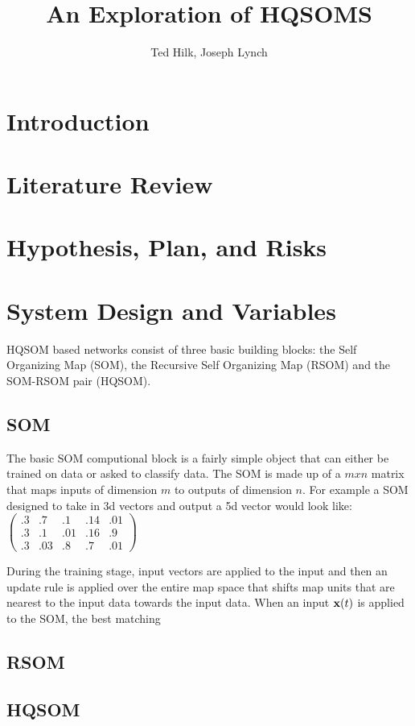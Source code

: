 \documentclass[a4paper,10pt]{article}
\title{An Exploration of HQSOMS}
\author{Ted Hilk, Joseph Lynch}
\begin{document}
\maketitle

\begin{abstract}

\end{abstract}

\section{Introduction}
\section{Literature Review}
\section{Hypothesis, Plan, and Risks}
\section{System Design and Variables}
HQSOM based networks consist of three basic building blocks: the Self Organizing Map (SOM), the
Recursive Self Organizing Map (RSOM) and the SOM-RSOM pair (HQSOM). 
\subsection{SOM}
The basic SOM computional block is a fairly simple object that can either be trained on data or
asked to classify data. The SOM is made up of a $mxn$ matrix that maps inputs of dimension $m$
to outputs of dimension $n$.  For example a SOM designed to take in 3d vectors and output a 5d
vector would look like:
$\begin{pmatrix}
.3 & .7 & .1  & .14 & .01\\
.3 & .1 & .01 & .16 & .9\\
.3 & .03 & .8 & .7  & .01
\end{pmatrix}$

During the training stage, input vectors are applied to the input and then an
update rule is applied over the entire map space that shifts map units that are nearest to the input
data towards the input data. When an input $\bold{x}(t)$ is applied to the SOM, the best matching 
\subsection{RSOM}
\subsection{HQSOM}
\end{document}
